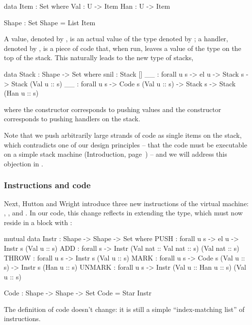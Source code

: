 \begin{code}
  data Item : Set where
    Val : U -> Item
    Han : U -> Item

  Shape : Set
  Shape = List Item
\end{code}
A value, denoted by , is an actual value of the type
denoted by ; a handler, denoted by , is a piece of code
that, when run, leaves a value of the type  on the top of the stack.
This naturally leads to the new type of stacks,
\label{sec:gmh-ham-stack}\begin{code}
  data Stack : Shape -> Set where
    snil : Stack []
    _\scons\_ : forall {u s} -> el u -> Stack s -> Stack (Val u :: s)
    _\sconsh\_ : forall {u s} -> Code s (Val u :: s) -> Stack s -> Stack (Han u :: s)
\end{code}
where the constructor \ident{\scons\!\!} corresponds to pushing values and the
constructor \ident{\sconsh\!\!} corresponds to pushing handlers on the stack.

Note that we push arbitrarily large strands of code as single items on the stack,
which contradicts one of our design principles -- that the
code must be executable on a simple stack machine (Introduction, page~\pageref{objectives})
-- and we will address this objection in .

\subsubsection{Instructions and code}

Next, Hutton and Wright introduce three new instructions of the virtual machine:
, , and . In our code, this change
reflects in extending the  type, which must now reside in a
 block with :

\label{sec:gmh-ham-instr}\begin{code}
  mutual
    data Instr : Shape -> Shape -> Set where
      PUSH : forall {u s} -> el u -> Instr s (Val u :: s)
      ADD : forall s -> Instr (Val nat :: Val nat :: s) (Val nat :: s)
      THROW : forall {u s} -> Instr s (Val u :: s)
      MARK : forall {u s} -> Code s (Val u :: s) -> Instr s (Han u :: s)
      UNMARK : forall {u s} -> Instr (Val u :: Han u :: s) (Val u :: s)

    Code : Shape -> Shape -> Set
    Code = Star Instr
\end{code}

\noindent The definition of code doesn't change: it is still a simple
``index-matching list'' of instructions.

